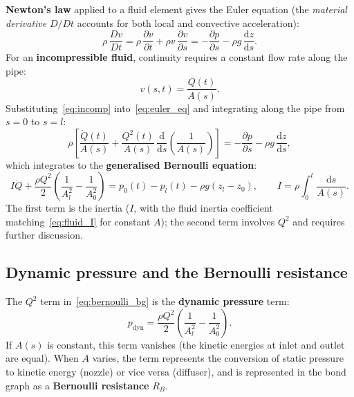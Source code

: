 \textbf{Newton's law} applied to a fluid element gives the Euler equation
(the \emph{material derivative} $D/Dt$ accounts for both local and
convective acceleration):
\begin{equation}
  \rho\,\frac{Dv}{Dt}
  = \rho\,\frac{\partial v}{\partial t} + \rho v\,\frac{\partial v}{\partial s}
  = -\frac{\partial p}{\partial s} - \rho g\,\frac{\mathrm{d}z}{\mathrm{d}s}.
  \label{eq:euler_eq}
\end{equation}
For an \textbf{incompressible fluid}, continuity requires a constant flow
rate along the pipe:
\begin{equation}
  v(s,t) = \frac{Q(t)}{A(s)}.
  \label{eq:incomp}
\end{equation}
Substituting~\eqref{eq:incomp} into~\eqref{eq:euler_eq} and integrating
along the pipe from $s=0$ to $s=l$:
\begin{equation}
  \rho\left[
    \frac{\dot{Q}(t)}{A(s)}
    + \frac{Q^{2}(t)}{A(s)}\,\frac{\mathrm{d}}{\mathrm{d}s}\!\left(\frac{1}{A(s)}\right)
  \right]
  = -\frac{\partial p}{\partial s} - \rho g\,\frac{\mathrm{d}z}{\mathrm{d}s},
\end{equation}
which integrates to the \textbf{generalised Bernoulli equation}:
\begin{equation}
  \boxed{
    I\dot{Q} + \frac{\rho Q^{2}}{2}\!\left(\frac{1}{A_{l}^{2}} - \frac{1}{A_{0}^{2}}\right)
    = p_{0}(t) - p_{l}(t) - \rho g(z_{l} - z_{0})
  },
  \qquad
  I = \rho\int_{0}^{l}\frac{\mathrm{d}s}{A(s)}.
  \label{eq:bernoulli_bg}
\end{equation}
The first term is the inertia ($I$, with the fluid inertia coefficient
matching~\eqref{eq:fluid_I} for constant $A$); the second term involves
$Q^{2}$ and requires further discussion.


\subsection{Dynamic pressure and the Bernoulli resistance}
\label{ssec:bernoulli_resistance}

The $Q^{2}$ term in~\eqref{eq:bernoulli_bg} is the \textbf{dynamic
pressure} term:
\begin{equation}
  p_{\mathrm{dyn}} = \frac{\rho Q^{2}}{2}\!\left(\frac{1}{A_{l}^{2}} - \frac{1}{A_{0}^{2}}\right).
  \label{eq:dynamic_pressure}
\end{equation}
If $A(s)$ is constant, this term vanishes (the kinetic energies at inlet
and outlet are equal).  When $A$ varies, the term represents the
conversion of static pressure to kinetic energy (nozzle) or vice versa
(diffuser), and is represented in the bond graph as a
\textbf{Bernoulli resistance} $R_{B}$.

